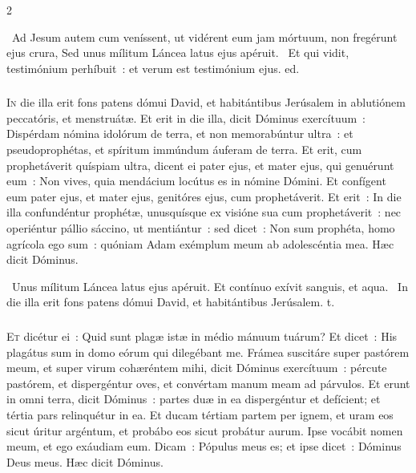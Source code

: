 \documentclass[9pt,twoside]{extarticle}
\begin{document}
\begin{multicols}{2}
\begin{tightlist}{}
\item {}~Ad Jesum autem cum veníssent, ut vidérent eum jam mórtuum, non fregérunt ejus crura, \textred{*} Sed unus mílitum Láncea latus ejus apéruit. ~Et qui vidit, testimónium perhíbuit~: et verum est testimónium ejus. ed.
\end{tightlist}

\subsubsection*{\center {}}
\lettrine{I}n die illa erit fons patens dómui David, et habitántibus Jerúsalem in ablutiónem peccatóris, et menstruátæ. Et erit in die illa, dicit Dóminus exercítuum~: Dispérdam nómina idolórum de terra, et non memorabúntur ultra~: et pseudoprophétas, et spíritum immúndum áuferam de terra. Et erit, cum prophetáverit quíspiam ultra, dicent ei pater ejus, et mater ejus, qui genuérunt eum~: Non vives, quia mendácium locútus es in nómine Dómini. Et confígent eum pater ejus, et mater ejus, genitóres ejus, cum prophetáverit. Et erit~: In die illa confundéntur prophétæ, unusquísque ex visióne sua cum prophetáverit~: nec operiéntur pállio sáccino, ut mentiántur~: sed dicet~: Non sum prophéta, homo agrícola ego sum~: quóniam Adam exémplum meum ab adolescéntia mea. Hæc dicit Dóminus.

\begin{tightlist}{}
\item {}~Unus mílitum Láncea latus ejus apéruit. \textred{*} Et contínuo exívit sanguis, et aqua. ~In die illa erit fons patens dómui David, et habitántibus Jerúsalem. t.
\end{tightlist}

\subsubsection*{\center {}}
\lettrine{E}t dicétur ei~: Quid sunt plagæ istæ in médio mánuum tuárum? Et dicet~: His plagátus sum in domo eórum qui dilegébant me. Frámea suscitáre super pastórem meum, et super virum cohæréntem mihi, dicit Dóminus exercítuum~: pércute pastórem, et dispergéntur oves, et convértam manum meam ad párvulos. Et erunt in omni terra, dicit Dóminus~: partes duæ in ea dispergéntur et defícient; et tértia pars relinquétur in ea. Et ducam tértiam partem per ignem, et uram eos sicut úritur argéntum, et probábo eos sicut probátur aurum. Ipse vocábit nomen meum, et ego exáudiam eum. Dicam~: Pópulus meus es; et ipse dicet~: Dóminus Deus meus. Hæc dicit Dóminus.


\end{multicols}
\end{document}
